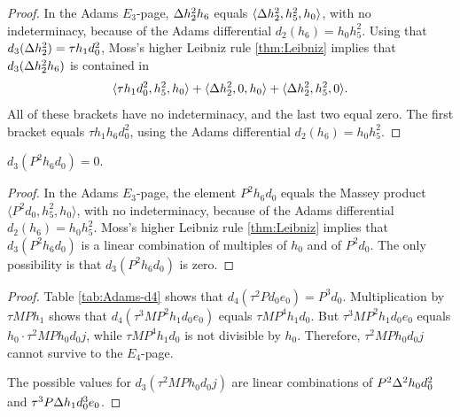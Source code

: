 \begin{proof}
In the Adams $E_3$-page, 
$\Delta h_2^2 h_6$ equals $\langle \Delta h_2^2, h_5^2, h_0 \rangle$,
with no indeterminacy, because of the Adams differential
$d_2(h_6) = h_0 h_5^2$.
Using that $d_3(\Delta h_2^2) = \tau h_1 d_0^2$, 
Moss's higher Leibniz rule \ref{thm:Leibniz}
implies that $d_3(\Delta h_2^2 h_6)$ is contained in
\[
\langle \tau h_1 d_0^2, h_5^2, h_0 \rangle +
\langle \Delta h_2^2, 0, h_0 \rangle +
\langle \Delta h_2^2, h_5^2, 0 \rangle.
\]
All of these brackets have no indeterminacy, and the last two
equal zero.
The first bracket equals $\tau h_1 h_6 d_0^2$, using the
Adams differential $d_2(h_6) = h_0 h_5^2$.
\end{proof}

\begin{lemma}
\label{lem:d3-P^2h6d0}
$d_3(P^2 h_6 d_0) = 0$.
\end{lemma}

\begin{proof}
In the Adams $E_3$-page, the element $P^2 h_6 d_0$ equals
the Massey product
$\langle P^2 d_0, h_5^2, h_0 \rangle$, with no indeterminacy,
because of the Adams differential $d_2(h_6) = h_0 h_5^2$.
Moss's higher Leibniz rule \ref{thm:Leibniz} implies
that $d_3(P^2 h_6 d_0)$ is a linear combination of multiples of
$h_0$ and of $P^2 d_0$.  The only possibility is that
$d_3(P^2 h_6 d_0)$ is zero.
\end{proof}

\begin{proof}
Table \ref{tab:Adams-d4} shows that
$d_4(\tau^2 P d_0 e_0) = P^3 d_0$.
Multiplication by $\tau M P h_1$ shows that
$d_4(\tau^3 M P^2 h_1 d_0 e_0)$ equals
$\tau M P^4 h_1 d_0$.
But $\tau^3 M P^2 h_1 d_0 e_0$ equals
$h_0 \cdot \tau^2 M P h_0 d_0 j$, 
while $\tau M P^4 h_1 d_0$ is not divisible by $h_0$.
Therefore,
$\tau^2 M P h_0 d_0 j$ cannot survive to the $E_4$-page.

The possible values for
$d_3(\tau^2 M P h_0 d_0 j)$ are
linear combinations of 
$P^2 \Delta^2 h_0 d_0^2$ and
$\tau^3 P \Delta h_1 d_0^3 e_0$.
\end{proof}

